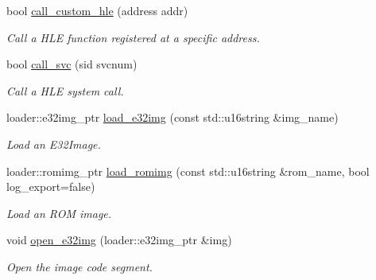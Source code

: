 \begin{DoxyCompactItemize}
\mbox{\label{classeka2l1_1_1hle_1_1lib__manager_a07b0828c1e42e7ca1dccf675aefb758f}} 
bool \mbox{\hyperlink{classeka2l1_1_1hle_1_1lib__manager_a07b0828c1e42e7ca1dccf675aefb758f}{call\+\_\+custom\+\_\+hle}} (address addr)
\begin{DoxyCompactList}\small\item\em Call a H\+LE function registered at a specific address. \end{DoxyCompactList}\item 
bool \mbox{\hyperlink{classeka2l1_1_1hle_1_1lib__manager_a8567be4292de6f27126064dd61b823fa}{call\+\_\+svc}} (sid svcnum)
\begin{DoxyCompactList}\small\item\em Call a H\+LE system call. \end{DoxyCompactList}\item 
\mbox{\label{classeka2l1_1_1hle_1_1lib__manager_a2a0e9db90f0d6bca0abb2e106d5d9369}} 
loader\+::e32img\+\_\+ptr \mbox{\hyperlink{classeka2l1_1_1hle_1_1lib__manager_a2a0e9db90f0d6bca0abb2e106d5d9369}{load\+\_\+e32img}} (const std\+::u16string \&img\+\_\+name)
\begin{DoxyCompactList}\small\item\em Load an E32\+Image. \end{DoxyCompactList}\item 
\mbox{\label{classeka2l1_1_1hle_1_1lib__manager_a68d19094e17efd07b3f97e37443ca0fb}} 
loader\+::romimg\+\_\+ptr \mbox{\hyperlink{classeka2l1_1_1hle_1_1lib__manager_a68d19094e17efd07b3f97e37443ca0fb}{load\+\_\+romimg}} (const std\+::u16string \&rom\+\_\+name, bool log\+\_\+export=false)
\begin{DoxyCompactList}\small\item\em Load an R\+OM image. \end{DoxyCompactList}\item 
\mbox{\label{classeka2l1_1_1hle_1_1lib__manager_a9c6a29b18515946fca9af8b9dc0a344d}} 
void \mbox{\hyperlink{classeka2l1_1_1hle_1_1lib__manager_a9c6a29b18515946fca9af8b9dc0a344d}{open\+\_\+e32img}} (loader\+::e32img\+\_\+ptr \&img)
\begin{DoxyCompactList}\small\item\em Open the image code segment. \end{DoxyCompactList}\item 

\end{DoxyCompactItemize}

